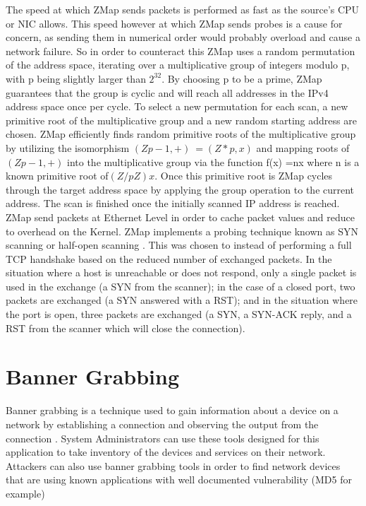 \documentclass[a4wide,leqno,12pt]{report}
\begin{document}
The speed at which ZMap sends packets is performed as fast as the source's CPU or NIC allows. This speed however at which ZMap sends probes is a cause for concern, as sending them in numerical order would probably overload and cause a network failure. So in order to counteract this ZMap uses a random permutation of the address space, iterating over a multiplicative group of integers modulo p, with p being slightly larger than $2^{32}$. By choosing p to be a prime, ZMap guarantees that the group is cyclic and
will reach all addresses in the IPv4 address space once per cycle. To select a new permutation for each scan, a new primitive root of the multiplicative group and a new random starting address are chosen. ZMap efficiently finds random primitive roots of
the  multiplicative  group  by  utilizing  the  isomorphism $(Zp - 1,+)~=(Z*p,x)$ and  mapping  roots of$(Zp-1,+)$ into the multiplicative group via the  function f(x) =nx where n is a known primitive root of$(Z/pZ)x$. Once this primitive root is ZMap cycles through the target address space by applying the group operation to the current address. The scan is finished once the initially scanned IP address is reached\cite{durumeric2013zmap}.\\

ZMap send packets at Ethernet Level in order to cache packet values and reduce to overhead on the Kernel.
ZMap implements a probing technique known as
SYN scanning or half-open scanning \cite{durumeric2013zmap}. This was chosen to instead of performing a full TCP handshake
based on the reduced number of exchanged packets.  In
the situation where a host is unreachable or does
not respond, only a single packet is used in the exchange (a SYN from
the scanner); in the case of a closed port, two packets
are exchanged (a SYN answered with a RST); and in the
situation where the port is open, three packets are
exchanged (a SYN, a SYN-ACK reply, and a RST from
the scanner which will close the connection)\cite{durumeric2013zmap}.


\section{Banner Grabbing} 
Banner grabbing is a technique used to gain information about a device on a network by establishing a connection and observing the output from the connection \cite{kondo2014penetration}. System Administrators can use these tools designed for this application to take inventory of the devices and services on their network. Attackers can also use banner grabbing tools in order to find network devices that are using known applications with well documented vulnerability (MD5 for example)
\end{document}
